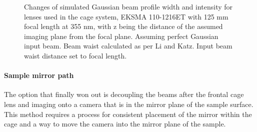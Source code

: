 \documentclass[twoside,openright,listof=numbered]{scrreprt}
\begin{document}
\begin{figure}[htbp]
\begin{subfigure}[t]{\textwidth}
\end{subfigure}
\caption[Changes of simulated Gaussian beam profile width and intensity for lenses used in the cage system.]{Changes of simulated Gaussian beam profile width and intensity for lenses used in the cage system, EKSMA 110-1216ET with 125 mm focal length at 355 nm, with z being the distance of the assumed imaging plane from the focal plane.  Assuming perfect Gaussian input beam. Beam waist calculated as per Li and Katz\cite{Li1994}. Input beam waist distance set to focal length. \label{fig:beamWaistCompendium}}
\end{figure}


\paragraph{Sample mirror path}\label{SampleMirrorCamera}
The option that finally won out is decoupling the beams after the frontal cage lens and imaging onto a camera that is in the mirror plane of the sample surface. This method requires a process for consistent placement of the mirror within the cage and a way to move the camera into the mirror plane of the sample.\\
\end{document}
